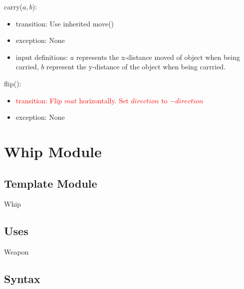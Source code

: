 \documentclass[12pt]{article}
\newcommand{\m}[1]{\mbox{#1}}
\begin{document}
\noindent carry($a, b$):
\begin{itemize}
    \item transition: Use inherited move()
    \item exception: None
    \item input definitions: $a$ represents the x-distance moved of object when being carried, $b$ represent the y-distance of the object when being carrried. 
\end{itemize}

\noindent flip():
\begin{itemize}
    \item \textcolor{red}{transition: Flip $mat$ horizontally. Set $direction$ to $-direction$}
    \item exception: None
\end{itemize}



\newpage

\section*{Whip Module}

\subsection*{Template Module}

Whip

\subsection*{Uses}

Weapon

\subsection*{Syntax}
\end{document}
